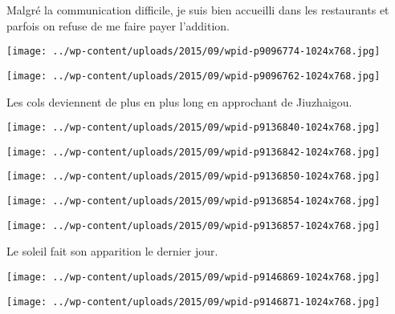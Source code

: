  Malgré la communication difficile, je suis bien accueilli dans les restaurants et parfois on refuse de me faire payer l'addition. 
\begin{center} \texttt{[image: ../wp-content/uploads/2015/09/wpid-p9096774-1024x768.jpg]} \end{center}
\begin{center} \texttt{[image: ../wp-content/uploads/2015/09/wpid-p9096762-1024x768.jpg]} \end{center}
\vspace{-\topsep}
\vspace{-2.75mm}
\pagebreak
 
   Les cols deviennent de plus en plus long en approchant de Jiuzhaigou. \\
   \vspace{0.75mm}
\begin{center} \texttt{[image: ../wp-content/uploads/2015/09/wpid-p9136840-1024x768.jpg]} \end{center}
\begin{center} \texttt{[image: ../wp-content/uploads/2015/09/wpid-p9136842-1024x768.jpg]} \end{center}
\begin{center} \texttt{[image: ../wp-content/uploads/2015/09/wpid-p9136850-1024x768.jpg]} \end{center}
\begin{center} \texttt{[image: ../wp-content/uploads/2015/09/wpid-p9136854-1024x768.jpg]} \end{center}
\begin{center} \texttt{[image: ../wp-content/uploads/2015/09/wpid-p9136857-1024x768.jpg]} \end{center}

 Le soleil fait son apparition le dernier jour. 
\begin{center} \texttt{[image: ../wp-content/uploads/2015/09/wpid-p9146869-1024x768.jpg]} \end{center}
\begin{center} \texttt{[image: ../wp-content/uploads/2015/09/wpid-p9146871-1024x768.jpg]} \end{center}
\vspace{-\topsep}
